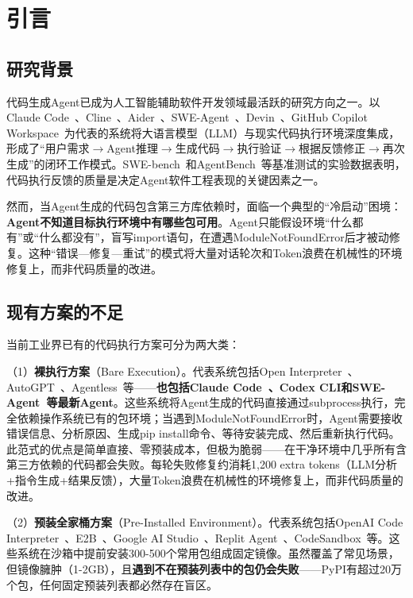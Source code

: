 \documentclass[10pt]{ctexart}
\begin{document}
\section{引言}

\subsection{研究背景}
代码生成Agent已成为人工智能辅助软件开发领域最活跃的研究方向之一。以Claude Code~\cite{anthropic2025claude}、Cline~\cite{cline2024}、Aider~\cite{guo2024aider}、SWE-Agent~\cite{jimenez2024sweagent}、Devin~\cite{cognition2024devin}、GitHub Copilot Workspace~\cite{github2024copilot}为代表的系统将大语言模型（LLM）与现实代码执行环境深度集成，形成了“用户需求$\rightarrow$Agent推理$\rightarrow$生成代码$\rightarrow$执行验证$\rightarrow$根据反馈修正$\rightarrow$再次生成”的闭环工作模式。SWE-bench~\cite{yang2024swebench}和AgentBench~\cite{liu2024agentbench}等基准测试的实验数据表明，代码执行反馈的质量是决定Agent软件工程表现的关键因素之一。

然而，当Agent生成的代码包含第三方库依赖时，面临一个典型的“冷启动”困境：\textbf{Agent不知道目标执行环境中有哪些包可用}。Agent只能假设环境“什么都有”或“什么都没有”，盲写import语句，在遭遇ModuleNotFoundError后才被动修复。这种“错误—修复—重试”的模式将大量对话轮次和Token浪费在机械性的环境修复上，而非代码质量的改进。

\subsection{现有方案的不足}
当前工业界已有的代码执行方案可分为两大类：

（1）\textbf{裸执行方案}（Bare Execution）。代表系统包括Open Interpreter~\cite{openinterpreter2023}、AutoGPT~\cite{autogpt2024}、Agentless~\cite{liu2024agentless}等——\textbf{也包括Claude Code~\cite{anthropic2025claude}、Codex CLI和SWE-Agent~\cite{jimenez2024sweagent}等最新Agent}。这些系统将Agent生成的代码直接通过subprocess执行，完全依赖操作系统已有的包环境；当遇到ModuleNotFoundError时，Agent需要接收错误信息、分析原因、生成pip install命令、等待安装完成、然后重新执行代码。此范式的优点是简单直接、零预装成本，但极为脆弱——在干净环境中几乎所有含第三方依赖的代码都会失败。每轮失败修复约消耗1,200 extra tokens（LLM分析+指令生成+结果反馈），大量Token浪费在机械性的环境修复上，而非代码质量的改进。

（2）\textbf{预装全家桶方案}（Pre-Installed Environment）。代表系统包括OpenAI Code Interpreter~\cite{openai2023code}、E2B~\cite{e2b2024}、Google AI Studio~\cite{google2024aistudio}、Replit Agent~\cite{replit2024}、CodeSandbox~\cite{codesandbox2024}等。这些系统在沙箱中提前安装300-500个常用包组成固定镜像。虽然覆盖了常见场景，但镜像臃肿（1-2GB），且\textbf{遇到不在预装列表中的包仍会失败}——PyPI有超过20万个包，任何固定预装列表都必然存在盲区。
\end{document}
